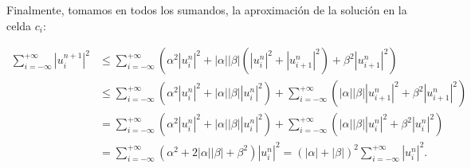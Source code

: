 \begin{frame}
    \frametitle{\secname}

    \begin{proofs}
        Finalmente, tomamos en todos los sumandos, la aproximación de la
        solución en la celda $c_{i}$:

        \begin{align*}
            \sum_{i=-\infty}^{+\infty}
            {\left|u^{n+1}_{i}\right|}^{2} & \leq
            \sum_{i=-\infty}^{+\infty}
            \left(
            \alpha^{2}
            {\left|u^{n}_{i}\right|}^{2}+
            \left|\alpha\right|
            \left|\beta\right|
            \left(
            \left|u^{n}_{i}\right|^{2}+
            \left|u^{n}_{i+1}\right|^{2}
            \right)+
            \beta^{2}
            {\left|u^{n}_{i+1}\right|}^{2}
            \right)                               \\
                                           & \leq
            \sum_{i=-\infty}^{+\infty}
            \left(
            \alpha^{2}
            \left|u^{n}_{i}\right|^{2}+
            \left|\alpha\right|
            \left|\beta\right|
            {\left|u^{n}_{i}\right|}^{2}
            \right)+
            \sum_{i=-\infty}^{+\infty}
            \left(
            \left|\alpha\right|
            \left|\beta\right|
            {\left|u^{n}_{i+1}\right|}^{2}+
            \beta^{2}
            {\left|u^{n}_{i+1}\right|}^{2}
            \right)                               \\
                                           & =
            \sum_{i=-\infty}^{+\infty}
            \left(
            \alpha^{2}
            {\left|u^{n}_{i}\right|}^{2}+
            \left|\alpha\right|
            \left|\beta\right|
            \left|u^{n}_{i}\right|^{2}
            \right)+
            \sum_{i=-\infty}^{+\infty}
            \left(
            \left|\alpha\right|
            \left|\beta\right|
            \left|u^{n}_{i}\right|^{2}+
            \beta^{2}
            {\left|u^{n}_{i}\right|}^{2}
            \right)                               \\
                                           & =
            \sum_{i=-\infty}^{+\infty}
            \left(
            \alpha^{2}+
            2\left|\alpha\right|
            \left|\beta\right|+
            \beta^{2}
            \right)
            \left|u^{n}_{i}\right|^{2}=
                {\left(\left|\alpha\right|+\left|\beta\right|\right)}^{2}
            \sum_{i=-\infty}^{+\infty}
            {\left|u^{n}_{i}\right|}^{2}.
        \end{align*}
    \end{proofs}
\end{frame}

